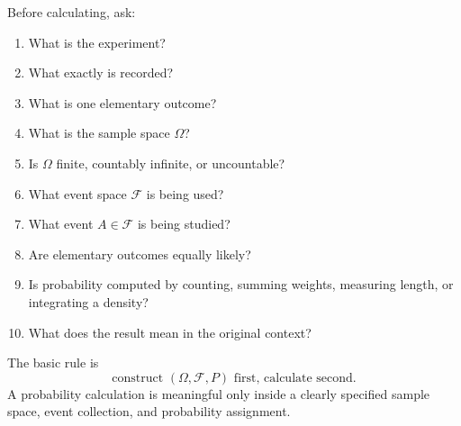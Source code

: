 Before calculating, ask:
\begin{enumerate}
    \item What is the experiment?
    \item What exactly is recorded?
    \item What is one elementary outcome?
    \item What is the sample space \(\Omega\)?
    \item Is \(\Omega\) finite, countably infinite, or uncountable?
    \item What event space \(\mathcal F\) is being used?
    \item What event \(A\in\mathcal F\) is being studied?
    \item Are elementary outcomes equally likely?
    \item Is probability computed by counting, summing weights, measuring length,
    or integrating a density?
    \item What does the result mean in the original context?
\end{enumerate}

\begin{theorembox}
The basic rule is
\[
\text{construct }(\Omega,\mathcal F,P)\text{ first, calculate second.}
\]
A probability calculation is meaningful only inside a clearly specified sample
space, event collection, and probability assignment.
\end{theorembox}
